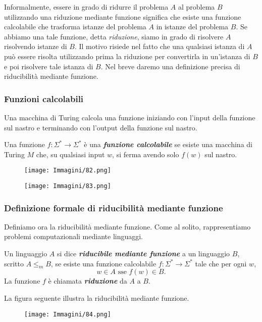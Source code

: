 \documentclass{article}
\begin{document}
Informalmente, essere in grado di ridurre il problema $A$ al problema $B$ utilizzando una riduzione mediante funzione significa che esiste una funzione calcolabile che trasforma istanze del problema $A$ in istanze del problema $B$.
Se abbiamo una tale funzione, detta \textit{riduzione}, siamo in grado di risolvere $A$ risolvendo istanze di $B$.
Il motivo risiede nel fatto che una qualsiasi istanza di $A$ può essere risolta utilizzando prima la riduzione per convertirla in un'istanza di $B$ e poi risolvere tale istanza di $B$.
Nel breve daremo una definizione precisa di riducibilità mediante funzione.

\subsubsection{Funzioni calcolabili}
Una macchina di Turing calcola una funzione iniziando con l'input della funzione sul nastro e terminando con l'output della funzione sul nastro.

\begin{tcolorbox}[title=Definizione 5.17]
    Una funzione $f : \Sigma^* \rightarrow \Sigma^*$ è una \textbf{\textit{funzione calcolabile}} se esiste una macchina di Turing $M$ che, su qualsiasi input $w$, si ferma avendo solo $f(w)$ sul nastro.
\end{tcolorbox}

\begin{figure}[H]
    \centering
    \texttt{[image: Immagini/82.png]}
    \label{fig:reducibility_function}
\end{figure}
\begin{figure}[H]
    \centering
    \texttt{[image: Immagini/83.png]}
    \label{fig:reducibility_function}
\end{figure}

\subsubsection*{Definizione formale di riducibilità mediante funzione}
Definiamo ora la riducibilità mediante funzione. Come al solito, rappresentiamo problemi computazionali mediante linguaggi.

\begin{tcolorbox}[title=Definizione 5.120]
Un linguaggio $A$ si dice \textbf{\textit{riducibile mediante funzione}} a un linguaggio $B$, scritto $A \leq_m B$, se esiste una funzione calcolabile $f : \Sigma^* \rightarrow \Sigma^*$ tale che per ogni $w$,
$$
w \in A \text{ sse } f(w) \in B.
$$
La funzione $f$ è chiamata \textbf{\textit{riduzione}} da $A$ a $B$.
\end{tcolorbox}
La figura seguente illustra la riducibilità mediante funzione.
\begin{figure}[H]
    \centering
    \texttt{[image: Immagini/84.png]}
    \label{fig:reducibility_function}
\end{figure}
\end{document}
